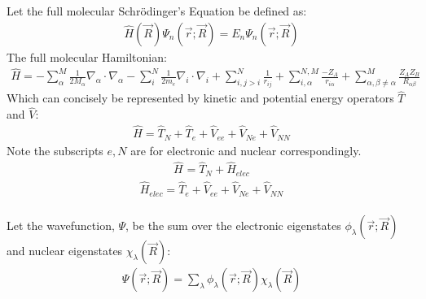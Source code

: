 \documentclass[letterpaper, 12pt, oneside]{report}
\begin{document}
    Let the full molecular Schrödinger's Equation be defined as: 
\begin{equation}\label{eq:schrodinger}
    \begin{split}
        \hat{H}(\Vec{R}) \Psi_{n}(\Vec{r};\Vec{R}) = E_n \Psi_{n}(\Vec{r};\Vec{R})
    \end{split}
\end{equation}
%
The full molecular Hamiltonian:
\begin{equation}%
    \begin{split}
        \hat{H} = -\sum_{\alpha}^{M} \frac{1}{2M_{\alpha}} \nabla_{\alpha} \cdot \nabla_{\alpha}
         -\sum_{i}^{N} \frac{1}{2m_{e}} \nabla_{i} \cdot \nabla_{i}
         + \sum_{i,j>i}^{N} \frac{1}{r_{ij}} + \sum_{i, \alpha}^{N,M} \frac{-Z_{A}}{r_{i\alpha}}
         + \sum_{\alpha, \beta \neq \alpha}^{M} \frac{Z_{A}Z_{B}}{R_{\alpha \beta}}
    \end{split}
\end{equation}
%
Which can concisely be represented by kinetic and potential energy operators $\hat{T}$ and $\hat{V}$:
\begin{equation}%
    \begin{split}
        \hat{H} = \hat{T}_{N} + \hat{T}_{e} + \hat{V}_{ee} + \hat{V}_{Ne} + \hat{V}_{NN}
    \end{split}
\end{equation}
%
Note the subscripts $e, N$ are for electronic and nuclear correspondingly.
\begin{equation}%
    \begin{split}
        \hat{H}_{} = \hat{T}_{N} + \hat{H}_{elec} 
    \end{split}
\end{equation}
%
\begin{equation}%
    \begin{split}
        \hat{H}_{elec} = \hat{T}_{e} + \hat{V}_{ee} + \hat{V}_{Ne} + \hat{V}_{NN}
    \end{split}
\end{equation}
\\ Let the wavefunction, $\Psi$, be the sum over the electronic eigenstates $\phi_{\lambda} (\Vec{r};\Vec{R})$ and nuclear eigenstates $\chi_{\lambda} (\Vec{R})$:
\begin{equation}%
    \begin{split}
        \Psi (\Vec{r};\Vec{R}) = \sum_{\lambda} \phi_{\lambda} (\Vec{r};\Vec{R}) \chi_{\lambda} (\Vec{R})
    \end{split}
\end{equation}
\end{document}
